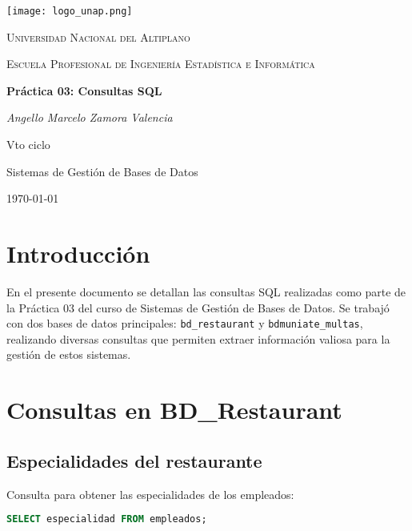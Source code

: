 \documentclass[12pt]{article}
\begin{document}
	
	\begin{titlepage}
		\centering
		\vspace*{1cm}
		
		\texttt{[image: logo\_unap.png]}\par
		\vspace{1cm}
		
		{\scshape\LARGE Universidad Nacional del Altiplano \par}
		\vspace{0.5cm}
		
		{\scshape\Large Escuela Profesional de Ingeniería Estadística e Informática\par}
		\vspace{1.5cm}
		
		{\huge\bfseries Práctica 03: Consultas SQL\par}
		\vspace{2cm}
		
		{\Large\itshape Angello Marcelo Zamora Valencia\par}
		\vfill
		\vspace{0.5cm}
		
		{\large Vto ciclo\par}
		{\large Sistemas de Gestión de Bases de Datos\par}
		{\large \today\par}
	\end{titlepage}
	
	\section{Introducción}
	En el presente documento se detallan las consultas SQL realizadas como parte de la Práctica 03 del curso de Sistemas de Gestión de Bases de Datos. Se trabajó con dos bases de datos principales: \texttt{bd\_restaurant} y \texttt{bdmuniate\_multas}, realizando diversas consultas que permiten extraer información valiosa para la gestión de estos sistemas.
	
	\section{Consultas en BD\_Restaurant}
	
	\subsection{Especialidades del restaurante}
	Consulta para obtener las especialidades de los empleados:
	\begin{lstlisting}[language=SQL]
		SELECT especialidad FROM empleados;
	\end{lstlisting}
	
\end{document}
